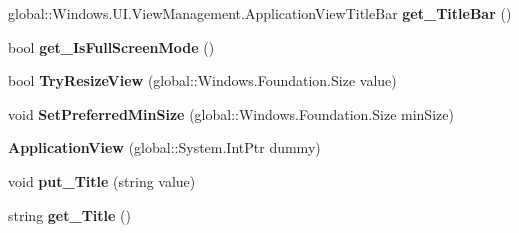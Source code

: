 \begin{DoxyCompactItemize}
\item 
\mbox{\label{class_windows_1_1_u_i_1_1_view_management_1_1_application_view_ab9b05a73da58fd42c06c39c87d3292d8}} 
global\+::\+Windows.\+U\+I.\+View\+Management.\+Application\+View\+Title\+Bar {\bfseries get\+\_\+\+Title\+Bar} ()
\item 
\mbox{\label{class_windows_1_1_u_i_1_1_view_management_1_1_application_view_afde1936ca2f8aded16b77720619151e5}} 
bool {\bfseries get\+\_\+\+Is\+Full\+Screen\+Mode} ()
\item 
\mbox{\label{class_windows_1_1_u_i_1_1_view_management_1_1_application_view_a239abe45572bb1478737b90836a4b386}} 
bool {\bfseries Try\+Resize\+View} (global\+::\+Windows.\+Foundation.\+Size value)
\item 
\mbox{\label{class_windows_1_1_u_i_1_1_view_management_1_1_application_view_a0578db6c17fe182700dc8c5cb8973a14}} 
void {\bfseries Set\+Preferred\+Min\+Size} (global\+::\+Windows.\+Foundation.\+Size min\+Size)
\item 
\mbox{\label{class_windows_1_1_u_i_1_1_view_management_1_1_application_view_a10e1e2089e594fe33f2e591fc465535c}} 
{\bfseries Application\+View} (global\+::\+System.\+Int\+Ptr dummy)
\item 
\mbox{\label{class_windows_1_1_u_i_1_1_view_management_1_1_application_view_ac9a73477b84f2c3e9e09660fdfe04e89}} 
void {\bfseries put\+\_\+\+Title} (string value)
\item 
\mbox{\label{class_windows_1_1_u_i_1_1_view_management_1_1_application_view_a08cf5cd5b2e28afa51bc13468334352a}} 
string {\bfseries get\+\_\+\+Title} ()
\item 
\mbox{\label{class_windows_1_1_u_i_1_1_view_management_1_1_application_view_a4327352f99894f72219cfb4cad222952}} 

\end{DoxyCompactItemize}
